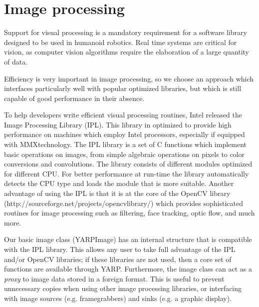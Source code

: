 \section{Image processing}

Support for visual processing is a mandatory requirement for a
software library designed to be used in humanoid robotics. Real time
systems are critical for vision, as computer vision algorithms require
the elaboration of a large quantity of data.

Efficiency is very important in image processing, so we choose
an approach which interfaces particularly well with popular
optimized libraries, but which is still capable of good
performance in their absence.

To help developers write efficient visual processing routines, Intel
released the Image Processing Library (IPL). This library in optimized
to provide high performance on machines which employ Intel processors,
especially if equipped with MMX\texttrademark technology. The IPL
library is a set of C functions which implement basic operations on
images, from simple algebraic operations on pixels to color
conversions and convolutions. The library consists of different
modules optimized for different CPU. For better performance at
run-time the library automatically detects the CPU type and loads the
module that is more suitable. Another advantage of using the IPL is
that it is at the core of the OpenCV library
(http://sourceforge.net/projects/opencvlibrary/) which provides 
sophisticated routines for image processing such as filtering, face
tracking, optic flow, and much more.

Our basic image class (YARPImage) has an internal structure that is
compatible with the IPL library.  This allows any user to take full
advantage of the IPL and/or OpenCV libraries; if these libraries
are not used, then a core set of functions are available through
YARP.  Furthermore, the image class can act as a {\em proxy} to image
data stored in a foreign format.  This is useful to prevent unnecessary
copies when using other image processing libraries, or interfacing
with image sources (e.g. framegrabbers) and sinks (e.g. a graphic
display).




